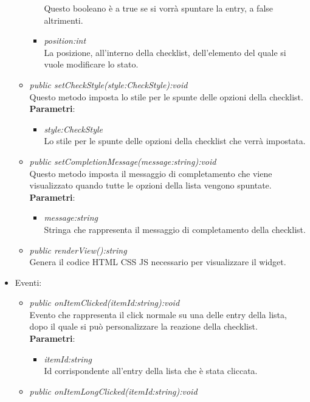 \begin{itemize}
\begin{itemize}
\begin{itemize}
		Questo booleano è a true se si vorrà spuntare la entry, a false altrimenti.
		\item \textit{position:int}\\
		La posizione, all'interno della checklist, dell'elemento del quale si vuole modificare lo stato. 
		\end{itemize}  
	\item \textit{public setCheckStyle(style:CheckStyle):void}\\
	Questo metodo imposta lo stile per le spunte delle opzioni della checklist.
		\\ \textbf{Parametri}: \begin{itemize}
		\item \textit{style:CheckStyle}\\
		Lo stile per le spunte delle opzioni della checklist che verrà impostata.
		\end{itemize} 
	\item \textit{public setCompletionMessage(message:string):void}\\
	Questo metodo imposta il messaggio di completamento che viene visualizzato quando tutte le opzioni della lista vengono spuntate.
		\\ \textbf{Parametri}: \begin{itemize}
		\item \textit{message:string}\\
		Stringa che rappresenta il messaggio di completamento della checklist.
		\end{itemize} 
	\item \textit{public renderView():string}\\
	Genera il codice HTML CSS JS necessario per visualizzare il widget.
	\end{itemize}
\item{Eventi}:
	\begin{itemize}
	\item \textit{public onItemClicked(itemId:string):void}\\
	Evento che rappresenta il click normale su una delle entry della lista, dopo il quale si può personalizzare la reazione della checklist.
		\\ \textbf{Parametri}: \begin{itemize}
		\item \textit{itemId:string}\\
		Id corrispondente all'entry della lista che è stata cliccata.
		\end{itemize} 
	\item \textit{public onItemLongClicked(itemId:string):void}\\

\end{itemize}
\end{itemize}
